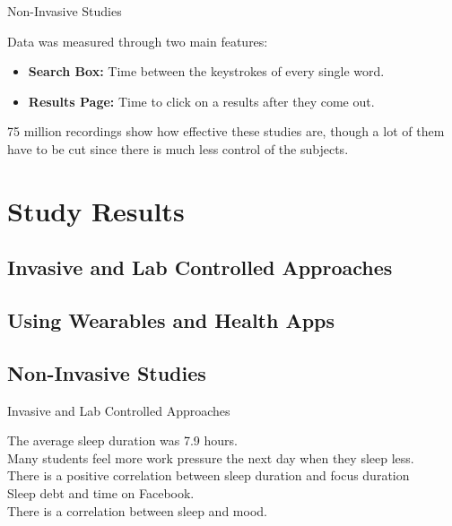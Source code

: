 \documentclass{beamer}
\begin{document}
\begin{frame}{Non-Invasive Studies}

Data was measured through two main features: 

\begin{itemize}
    \item \textbf{Search Box:} Time between the keystrokes of every single word.
    \item \textbf{Results Page:} Time to click on a results after they come out.
\end{itemize}

\bigskip

75 million recordings show how effective these studies are, though a lot of them have to be cut since there is much less control of the subjects. 
    
\end{frame}

\section{Study Results}

\subsection{Invasive and Lab Controlled Approaches}

\subsection{Using Wearables and Health Apps}

\subsection{Non-Invasive Studies}

\begin{frame}{Invasive and Lab Controlled Approaches}

The average sleep duration was 7.9 hours. \\
\bigskip
Many students feel more work pressure the next day when they sleep less. \\
\bigskip
There is a positive correlation between sleep duration and focus duration \\
\bigskip
Sleep debt and time on Facebook. \\
\bigskip
There is a correlation between sleep and mood. \\

\end{frame}
\end{document}
